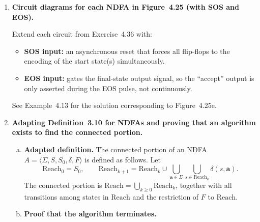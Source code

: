 \begin{enumerate}[{4.}1.]
For each NDFA $A_i$ in Figure~4.25, with $\Sigma=\{\pmb{a},\pmb{b},\pmb{c}\}$:
\begin{enumerate}[1.]
  \item Assign a bit-vector encoding to each state.
  \item For each state $s_j$ and each input letter $\pmb{\sigma}$, compute the
    set of states $\delta(s_j,\pmb{\sigma})$.
  \item The $D$ input of the flip-flop for state $s_k$ is the OR of the outputs
    of all flip-flops $s_j$ for which $s_k\in\delta(s_j,\pmb{\sigma}_{current})$.
  \item The output is the OR of all final-state flip-flops.
\end{enumerate}
(Specific gate-level diagrams depend on the transitions shown in Figure~4.25.)

\item \textbf{Circuit diagrams for each NDFA in Figure~4.25 (with SOS and EOS).}

Extend each circuit from Exercise~4.36 with:
\begin{itemize}
  \item \textbf{SOS input:} an asynchronous reset that forces all flip-flops to
    the encoding of the start state(s) simultaneously.
  \item \textbf{EOS input:} gates the final-state output signal, so the
    ``accept'' output is only asserted during the EOS pulse, not continuously.
\end{itemize}
See Example~4.13 for the solution corresponding to Figure~4.25e.

\item \textbf{Adapting Definition~3.10 for NDFAs and proving that an algorithm
exists to find the connected portion.}

\begin{enumerate}[(a)]
  \item \textbf{Adapted definition.}  The connected portion of an NDFA
  $A=\langle\Sigma,S,S_0,\delta,F\rangle$ is defined as follows.  Let
  \[
    \text{Reach}_0 = S_0,\qquad
    \text{Reach}_{k+1} = \text{Reach}_k
      \cup\bigcup_{\pmb{a}\in\Sigma}\bigcup_{s\in\text{Reach}_k}\delta(s,\pmb{a}).
  \]
  The connected portion is $\text{Reach}=\bigcup_{k\ge 0}\text{Reach}_k$, together
  with all transitions among states in $\text{Reach}$ and the restriction of
  $F$ to $\text{Reach}$.

  \item \textbf{Proof that the algorithm terminates.}


\end{enumerate}
\end{enumerate}
